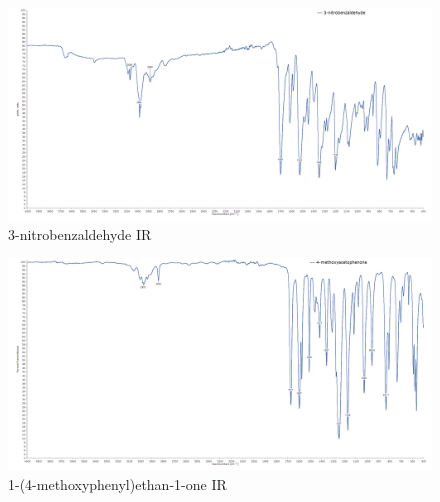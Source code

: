 \documentclass[11pt]{article}
\begin{document}
\newpage
\begin{figure}[H]
    \centering
    \includegraphics[scale=0.234]{spectra/ir4.1.png}
    \caption{3-nitrobenzaldehyde IR}
\end{figure}
\begin{figure}[H]
    \centering
    \includegraphics[scale=0.234]{spectra/ir5.1.png}
    \caption{1-(4-methoxyphenyl)ethan-1-one IR}
\end{figure}
\end{document}
